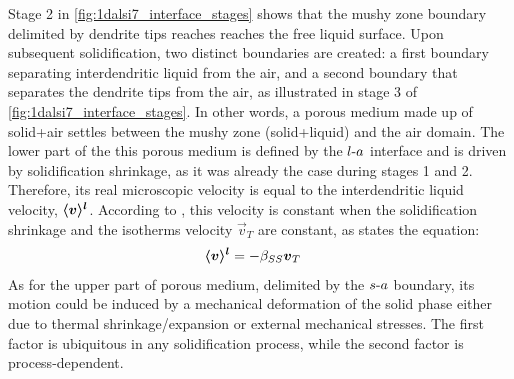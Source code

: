 Stage 2 in \cref{fig:1dalsi7_interface_stages} shows that the mushy zone boundary delimited by dendrite tips reaches
reaches the free liquid surface. Upon subsequent solidification, two distinct boundaries are created: 
a first boundary separating interdendritic liquid from the air, and a second boundary that separates the dendrite tips from the air,
as illustrated in stage 3 of \cref{fig:1dalsi7_interface_stages}.
In other words, a porous medium made up of solid+air settles between the mushy zone (solid+liquid) and the air domain. 
The lower part of the this porous medium is defined by the $l\text{-}a$ interface and is driven by solidification shrinkage,
as it was already the case during stages 1 and 2.
Therefore, its real microscopic velocity is equal to the interdendritic liquid velocity, $\boldsymbol{\langle v \rangle^l}$. 
According to \citet{dantzig_solidification_2009},
this velocity is constant when the solidification shrinkage and the isotherms velocity $\vec{v}_T$ are constant, as states the equation:
\begin{align}
\label{eq:real_velocity}
& \boldsymbol{\langle v \rangle^l} = -\beta_{SS} \boldsymbol{v}_T
\end{align}
As for the upper part of porous medium, delimited by the $s\text{-}a$ boundary, its motion could be induced by a 
mechanical deformation of the solid phase either due to thermal shrinkage/expansion or external mechanical stresses.
The first factor is ubiquitous in any solidification process, while the second factor is process-dependent. 

